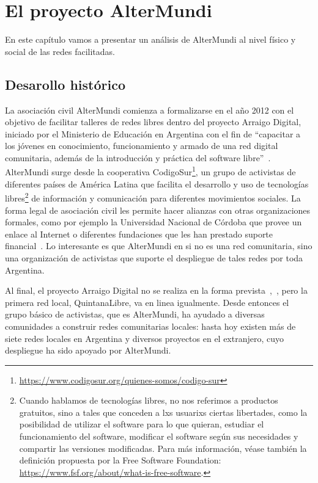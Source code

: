 \section{El proyecto AlterMundi}

En este capítulo vamos a presentar un análisis de AlterMundi al nivel físico y social de las redes facilitadas.

\subsection{Desarollo histórico}

La asociación civil AlterMundi comienza a formalizarse en el año 2012 con el objetivo de facilitar talleres de redes libres dentro del proyecto Arraigo Digital, iniciado por el Ministerio de Educación en Argentina con el fin de ``capacitar a los jóvenes en conocimiento, funcionamiento y armado de una red digital comunitaria, además de la introducción y práctica del software libre''~\autocite{Piccoli2015}.
AlterMundi surge desde la cooperativa CodigoSur\footnote{\url{https://www.codigosur.org/quienes-somos/codigo-sur}}, un grupo de activistas de diferentes países de América Latina que facilita el desarrollo y uso de tecnologías libres\footnote{Cuando
 hablamos de tecnologías libres, no nos referimos a productos gratuitos, sino a tales que conceden a lxs usuarixs ciertas libertades, como la posibilidad de utilizar el software para lo que quieran, estudiar el funcionamiento del software, modificar el software según sus necesidades y compartir las versiones modificadas.
Para más información, véase también la definición propuesta por la Free Software Foundation: \url{https://www.fsf.org/about/what-is-free-software}.}
de información y comunicación para diferentes movimientos sociales.
La forma legal de asociación civil les permite hacer alianzas con otras organizaciones formales, como por ejemplo la Universidad Nacional de Córdoba que provee un enlace al Internet o diferentes fundaciones que les han prestado suporte financial~\autocite{Vaseva2016a}.
Lo interesante es que AlterMundi en si no es una red comunitaria, sino una organización de activistas que suporte el despliegue de tales redes por toda Argentina.

Al final, el proyecto Arraigo Digital no se realiza en la forma prevista~\autocite{Vaseva2016a},~\autocite{Piccoli2015}, pero la primera red local, QuintanaLibre, va en linea igualmente.
Desde entonces el grupo básico de activistas, que es AlterMundi, ha ayudado a diversas comunidades a construir redes comunitarias locales:
hasta hoy existen más de siete redes locales en Argentina y diversos proyectos en el extranjero, cuyo despliegue ha sido apoyado por AlterMundi.

